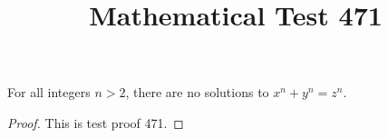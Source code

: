 \documentclass{amsart}
\begin{document}
\title{Mathematical Test 471}
\begin{theorem}
For all integers $n > 2$, there are no solutions to $x^n + y^n = z^n$.
\end{theorem}
\begin{proof}
This is test proof 471.
\end{proof}
\end{document}
